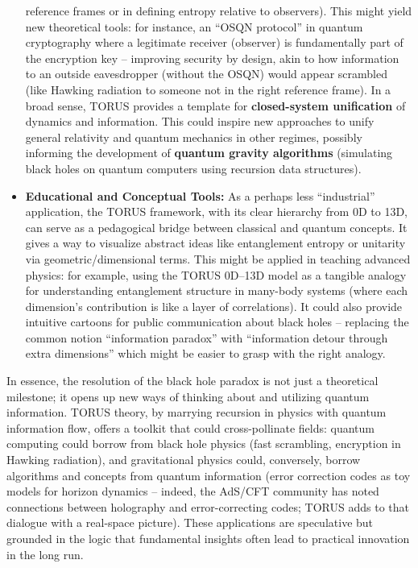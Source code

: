 \documentclass[]{article}
\begin{document}
\begin{itemize}
  reference frames or in defining entropy relative to observers). This
  might yield new theoretical tools: for instance, an ``OSQN protocol''
  in quantum cryptography where a legitimate receiver (observer) is
  fundamentally part of the encryption key -- improving security by
  design, akin to how information to an outside eavesdropper (without
  the OSQN) would appear scrambled (like Hawking radiation to someone
  not in the right reference frame). In a broad sense, TORUS provides a
  template for \textbf{closed-system unification} of dynamics and
  information. This could inspire new approaches to unify general
  relativity and quantum mechanics in other regimes, possibly informing
  the development of \textbf{quantum gravity algorithms} (simulating
  black holes on quantum computers using recursion data structures).
\item
  \textbf{Educational and Conceptual Tools:} As a perhaps less
  ``industrial'' application, the TORUS framework, with its clear
  hierarchy from 0D to 13D, can serve as a pedagogical bridge between
  classical and quantum concepts. It gives a way to visualize abstract
  ideas like entanglement entropy or unitarity via geometric/dimensional
  terms. This might be applied in teaching advanced physics: for
  example, using the TORUS 0D--13D model as a tangible analogy for
  understanding entanglement structure in many-body systems (where each
  dimension's contribution is like a layer of correlations). It could
  also provide intuitive cartoons for public communication about black
  holes -- replacing the common notion ``information paradox'' with
  ``information detour through extra dimensions'' which might be easier
  to grasp with the right analogy.
\end{itemize}

In essence, the resolution of the black hole paradox is not just a
theoretical milestone; it opens up new ways of thinking about and
utilizing quantum information. TORUS theory, by marrying recursion in
physics with quantum information flow, offers a toolkit that could
cross-pollinate fields: quantum computing could borrow from black hole
physics (fast scrambling, encryption in Hawking radiation), and
gravitational physics could, conversely, borrow algorithms and concepts
from quantum information (error correction codes as toy models for
horizon dynamics -- indeed, the AdS/CFT community has noted connections
between holography and error-correcting codes; TORUS adds to that
dialogue with a real-space picture). These applications are speculative
but grounded in the logic that fundamental insights often lead to
practical innovation in the long run.
\end{document}
